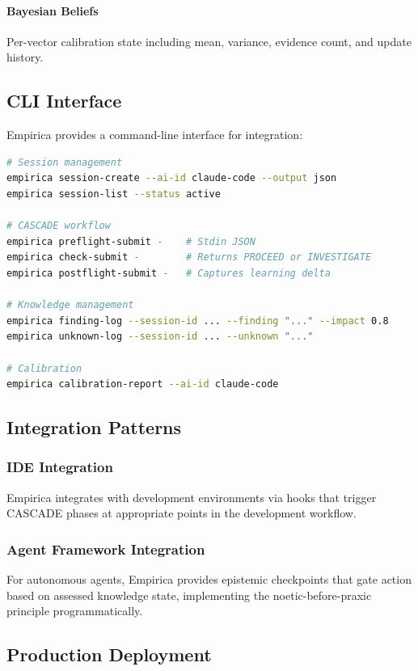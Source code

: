 \paragraph{Bayesian Beliefs} Per-vector calibration state including mean, variance, evidence count, and update history.

\subsection{CLI Interface}

Empirica provides a command-line interface for integration:

\begin{lstlisting}[language=bash,caption={Empirica CLI commands}]
# Session management
empirica session-create --ai-id claude-code --output json
empirica session-list --status active

# CASCADE workflow
empirica preflight-submit -    # Stdin JSON
empirica check-submit -        # Returns PROCEED or INVESTIGATE
empirica postflight-submit -   # Captures learning delta

# Knowledge management
empirica finding-log --session-id ... --finding "..." --impact 0.8
empirica unknown-log --session-id ... --unknown "..."

# Calibration
empirica calibration-report --ai-id claude-code
\end{lstlisting}

\subsection{Integration Patterns}

\subsubsection{IDE Integration}

Empirica integrates with development environments via hooks that trigger CASCADE phases at appropriate points in the development workflow.

\subsubsection{Agent Framework Integration}

For autonomous agents, Empirica provides epistemic checkpoints that gate action based on assessed knowledge state, implementing the noetic-before-praxic principle programmatically.

\subsection{Production Deployment}

